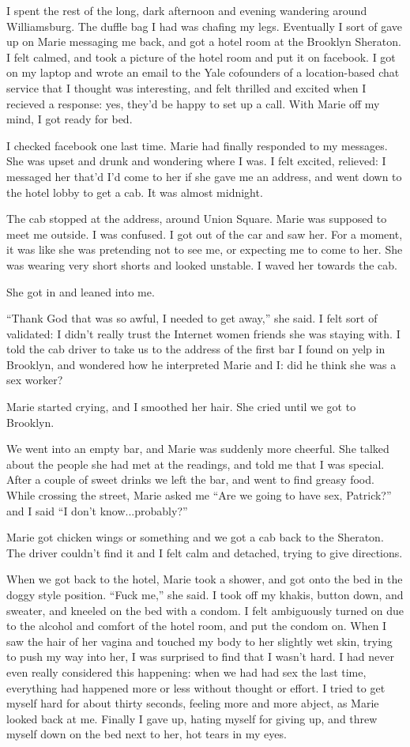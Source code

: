 \documentclass[12pt]{article}
\begin{document}
I spent the rest of the long, dark afternoon and evening wandering around
Williamsburg.  The duffle bag I had was chafing my legs.  Eventually I sort
of gave up on Marie messaging me back, and got a hotel room at the Brooklyn
Sheraton.  I felt calmed, and took a picture of the hotel room and put it on
facebook.  I got on my laptop and wrote an email to the Yale cofounders of a
location-based chat service that I thought was interesting, and felt thrilled
and excited when I recieved a response: yes, they'd be happy to set up a call.
With Marie off my mind, I got ready for bed.  

I checked facebook one last time.  Marie had finally responded to my messages.
She was upset and drunk and wondering where I was.  I felt excited, relieved: I
messaged her that'd I'd come to her if she gave me an address, and went down to
the hotel lobby to get a cab.  It was almost midnight.

The cab stopped at the address, around Union Square.  Marie was supposed to meet
me outside. I was confused.  I got out of the car and saw her.  For a moment, it
was like she was pretending not to see me, or expecting me to come to her.  She
was wearing very short shorts and looked unstable.  I waved her towards the cab.  

She got in and leaned into me.

``Thank God that was so awful, I needed to get away,'' she said.  I felt sort of
validated: I didn't really trust the Internet women friends she was staying
with.  I told the cab driver to take us to the address of the first bar I found
on yelp in Brooklyn, and wondered how he interpreted Marie and I: did he think
she was a sex worker?  

Marie started crying, and I smoothed her hair.  She cried until we got to
Brooklyn.

We went into an empty bar, and Marie was suddenly more cheerful.  She talked
about the people she had met at the readings, and told me that I was special.
After a couple of sweet drinks we left the bar, and went to find greasy food.
While crossing the street, Marie asked me ``Are we going to have sex, Patrick?''
and I said ``I don't know...probably?''

Marie got chicken wings or something and we got a cab back to the Sheraton.  The
driver couldn't find it and I felt calm and detached, trying to give directions.  

When we got back to the hotel, Marie took a shower, and got onto the bed in the
doggy style position.  ``Fuck me,'' she said.  I took off my khakis, button down,
and sweater, and kneeled on the bed with a condom.  I felt ambiguously turned on
due to the alcohol and comfort of the hotel room, and put the condom on.  When I
saw the hair of her vagina and touched my body to her slightly wet skin, trying
to push my way into her, I was surprised to find that I wasn't hard.  I had
never even really considered this happening: when we had had sex the last time,
everything had happened more or less without thought or effort.  I tried to get
myself hard for about thirty seconds, feeling more and more abject, as Marie
looked back at me.  Finally I gave up, hating myself for giving up, and threw
myself down on the bed next to her, hot tears in my eyes.
\end{document}

